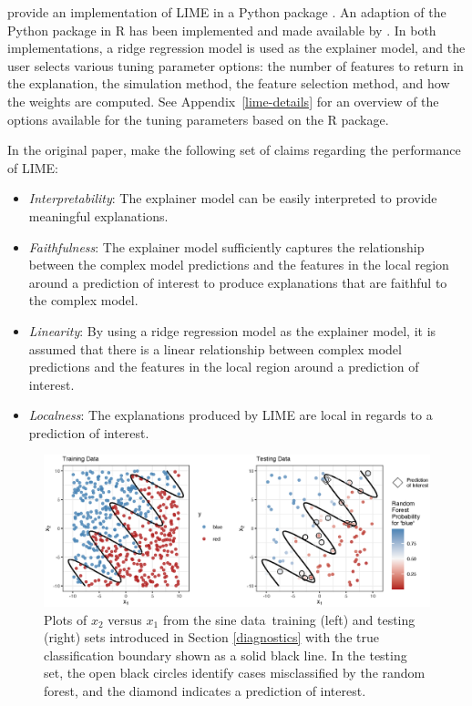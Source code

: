 \documentclass[AMS,STIX2COL]{WileyNJD-v2}\usepackage[]{graphicx}\usepackage[]{color}
\newenvironment{knitrout}{}{} %
\newcommand{\data}{sine data}
\begin{document}
\citet{ribeiro:2016} provide an implementation of LIME in a Python package \cite{ribeiro:2020}. An adaption of the Python package in R has been implemented and made available by \citet{pedersen:2020}. In both implementations, a ridge regression model is used as the explainer model, and the user  selects various tuning parameter options: the number of features to return in the explanation, the simulation method, the feature selection method, and how the weights are computed. See Appendix~\ref{lime-details} for an overview of the options available for the tuning parameters based on the R package.

In the original paper, \citet{ribeiro:2016} make the following set of claims regarding the performance of LIME:

\begin{itemize}
\item \emph{Interpretability}: The explainer model can be easily interpreted to provide meaningful explanations.
\item \emph{Faithfulness}: The explainer model sufficiently captures the relationship between the complex model predictions and the features in the local region around a prediction of interest to produce explanations that are faithful to the complex model.
\item \emph{Linearity}: By using a ridge regression model as the explainer model, it is assumed that there is a linear relationship between complex model predictions and the features in the local region around a prediction of interest.
\item \emph{Localness}: The explanations produced by LIME are local in regards to a prediction of interest.
\end{itemize}



\begin{figure}[!thp]
\centering
\begin{knitrout}
\color{fgcolor}

{\centering \includegraphics[width=6.5in]{figure-02-1} 

}



\end{knitrout}
\caption{Plots of $x_2$ versus $x_1$ from the \data \ training (left) and testing (right) sets introduced in Section \ref{diagnostics} with the true classification boundary shown as a solid black line. In the testing set, the open black circles identify cases misclassified by the random forest, and the diamond indicates a prediction of interest.}
\label{fig:figure-02}
\end{figure}
\end{document}
